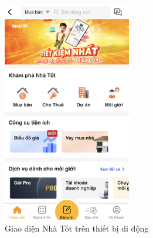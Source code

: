 \begin{figure}[H]
    \centering
    \includegraphics[width=0.5\textwidth]{Images/RelatedSystems/NhatotMobile.PNG}
    \caption{Giao diện Nhà Tốt trên thiết bị di động}
\end{figure}
